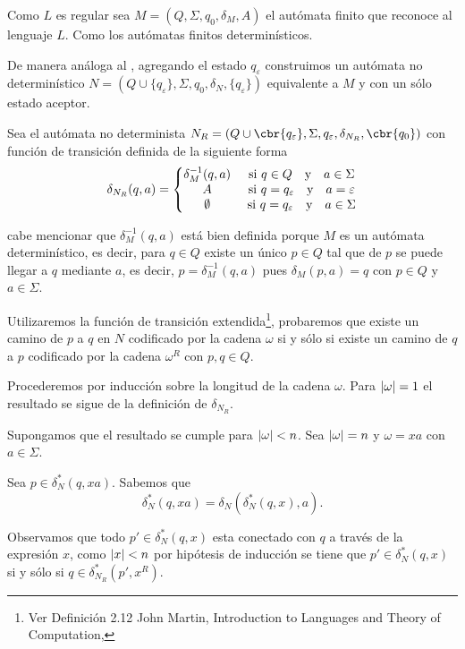 \documentclass{article}
\begin{document}
\Proof
Como $L$ es regular sea $M=(Q,\Sigma,q_0,\delta_M,A)$ el autómata finito que reconoce al lenguaje $L$. Como los autómatas finitos determinísticos. 

De manera análoga al , agregando el estado $q_{\varepsilon}$ construimos un autómata no determinístico $N=(Q\cup \{q_{\varepsilon}\},\Sigma,q_0,\delta_N,\{q_{\varepsilon}\})$ equivalente a $M$ y con un sólo estado aceptor. 

Sea el autómata no determinista $N_R=(Q\cup\cbr{q_{\varepsilon}},\Sigma,q_{\varepsilon},\delta_{N_R},\cbr{q_0})$ con función de transición definida de la siguiente forma 
\begin{equation*}
    \delta_{N_R}(q,a)=\left\lbrace\begin{matrix}
        \delta_M^{-1}(q,a)&\mbox{ si }q\in Q\quad\mbox{y}\quad a\in\Sigma\\ 
        A& \mbox{ si }q=q_\varepsilon\quad\mbox{y}\quad a=\varepsilon\\ 
        \emptyset&\mbox{ si }q=q_{\varepsilon}\quad\mbox{y}\quad a\in \Sigma
    \end{matrix}\right.
\end{equation*}

cabe mencionar que $\delta_M^{-1}(q,a)$ está bien definida porque $M$ es un autómata determinístico, es decir, para $q\in Q$ existe un único $p\in Q$ tal que de $p$ se puede llegar a $q$ mediante $a$, es decir, $p=\delta_M^{-1}(q,a)$ pues $\delta_M(p,a)=q$ con $p\in Q$ y $a\in\Sigma$.

Utilizaremos la función de transición extendida\footnote{Ver Definición 2.12 John Martin, Introduction to Languages and Theory of Computation, }, probaremos que existe un camino de $p$ a $q$ en $N$ codificado por la cadena $\omega$ si y sólo si existe un camino de $q$ a $p$ codificado por la cadena $\omega^R$ con $p,q\in Q$.

Procederemos por inducción sobre la longitud de la cadena $\omega$. Para $\lvert\omega\rvert=1$ el resultado se sigue de la definición de $\delta_{N_R}$.

Supongamos que el resultado se cumple para $\lvert\omega\rvert<n$. Sea $\lvert\omega\rvert=n$ y $\omega=xa$ con $a\in\Sigma$.

Sea $p\in\delta_N^{\ast}(q,xa)$. Sabemos que 
\begin{equation*}
    \delta_N^{\ast}(q,xa)=\delta_N(\delta_{N}^{\ast}(q,x),a).
\end{equation*}

Observamos que todo $p'\in \delta_{N}^{\ast}(q,x)$ esta conectado con $q$ a través de la expresión $x$, como $\lvert x\rvert<n$ por hipótesis de inducción se tiene que $p'\in \delta_{N}^{\ast}(q,x)$ si y sólo si $q\in\delta_{N_R}^{\ast}(p',x^R)$.
\end{document}
